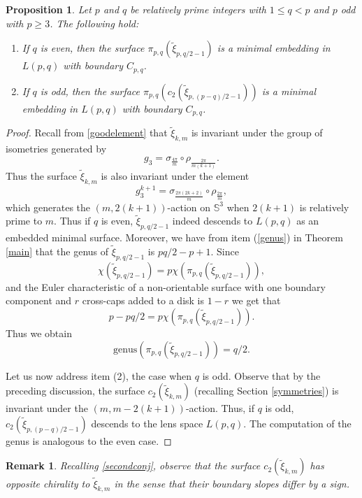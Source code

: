 \documentclass[11pt, reqno]{amsart}
\newtheorem{rmk}[thm]{Remark}
\newtheorem{prop}[thm]{Proposition}
\numberwithin{equation}{section}
\begin{document}
\begin{prop}\label{crosscap}
Let $p$ and $q$ be relatively prime integers with $1\leq q<p$ and $p$ odd with $p\geq 3$. The following hold: 
\begin{enumerate}
    \item If $q$ is even, then the surface $\pi_{p,q}(\tilde{\xi}_{p,q/2-1})$ is a minimal embedding in $L(p,q)$ with boundary $C_{p,q}$.
    \item If $q$ is odd, then the surface $\pi_{p,q}(c_2(\tilde{\xi}_{p,(p-q)/2-1}))$ is a minimal embedding in $L(p,q)$ with boundary $C_{p,q}$.
\end{enumerate}
\end{prop}
\begin{proof}
Recall from \eqref{goodelement} that $\tilde{\xi}_{k,m}$ is invariant under the group of isometries generated by
\begin{equation}
g_3=\sigma_{\frac{4\pi}{m}}\circ\rho_{\frac{2\pi}{m(k+1)}}.
\end{equation}
Thus the surface $\tilde{\xi}_{k,m}$ is also invariant under the element
\begin{equation}
g_3^{k+1}=\sigma_{\frac{2\pi(2k+2)}{m}}\circ\rho_{\frac{2\pi}{m}}, 
\end{equation}
which generates the $(m,2(k+1))$-action on $\mathbb{S}^3$ when $2(k+1)$ is relatively prime to $m$. Thus if $q$ is even, $\tilde{\xi}_{p,q/2-1}$ indeed descends to $L(p,q)$ as an embedded minimal surface.  Moreover, we have from item 
(\ref{genus}) in Theorem \ref{main} that the genus of $\tilde{\xi}_{p,q/2-1}$ is $pq/2-p+1$.  Since
\begin{equation}
\chi(\tilde{\xi}_{p,q/2-1})=p\chi(\pi_{p,q}(\tilde{\xi}_{p,q/2-1})), 
\end{equation}
and the Euler characteristic of a non-orientable surface with one boundary component and $r$ cross-caps added to a disk is $1-r$ we get that
\begin{equation}
p-pq/2 = p\chi(\pi_{p,q}(\tilde{\xi}_{p,q/2-1})).
\end{equation}
Thus we obtain
\begin{equation}
\mbox{genus}(\pi_{p,q}(\tilde{\xi}_{p,q/2-1}))=q/2.
\end{equation}

Let us now address item (2), the case when $q$ is odd.  Observe that by the preceding discussion, the surface $c_2(\tilde{\xi}_{k,m})$ (recalling Section \ref{symmetries}) is invariant under the $(m,m-2(k+1))$-action. Thus, if $q$ is odd, $c_2(\tilde{\xi}_{p,(p-q)/2-1})$ descends to the lens space $L(p,q)$.  The computation of the genus is analogous to the even case.
\end{proof}
\begin{rmk}
Recalling \eqref{secondconj}, observe that the surface $c_2(\tilde{\xi}_{k,m})$ has opposite chirality to $\tilde{\xi}_{k,m}$ in the sense that their boundary slopes differ by a sign.
\end{rmk}
\end{document}
